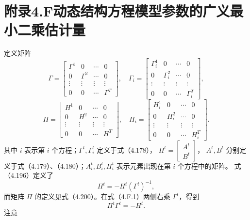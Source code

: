 \section*{附录4.F\quad 动态结构方程模型参数的广义最小二乘估计量}

定义矩阵
\[
\Gamma=\begin{bmatrix}
\Gamma^1&0&\cdots&0\\0&\Gamma^2&\cdots&0\\
\vdots&\vdots&\vdots&\vdots\\0&0&\cdots&\Gamma^T
\end{bmatrix},\quad
\Gamma_i=\begin{bmatrix}
\Gamma_i^1&0&\cdots&0\\0&\Gamma_i^2&\cdots&0\\
\vdots&\vdots&\vdots&\vdots\\0&0&\cdots&\Gamma_i^T
\end{bmatrix},
\]
\[
H=\begin{bmatrix}
H^1&0&\cdots&0\\0&H^2&\cdots&0\\
\vdots&\vdots&\vdots&\vdots\\0&0&\cdots&H^T
\end{bmatrix},\quad
H_i=\begin{bmatrix}
H_i^1&0&\cdots&0\\0&H_i^2&\cdots&0\\
\vdots&\vdots&\vdots&\vdots\\0&0&\cdots&H_i^T
\end{bmatrix}.
\]
其中 $i$ 表示第 $i$ 个方程；$\Gamma^t,\Gamma_i^t$ 定义于式（4.178），
$H^t=\begin{bmatrix}A^t\\B^t\end{bmatrix}$，
$A^t,B^t$ 分别定义于式（4.179）、（4.180）；$A_i^t,B_i^t,H_i^t$ 表示元素出现在第 $i$ 个方程中的矩阵。
式（4.196）定义了
\begin{equation}
\Pi^t=-H^t(\Gamma^t)^{-1},\tag{4.F.1}
\end{equation}
而矩阵 $\Pi$ 的定义见式（4.200）。在式（4.F.1）两侧右乘 $\Gamma^t$，得到
\begin{equation}
\Pi^t\Gamma^t=-H^t.\tag{4.F.2}
\end{equation}
注意
